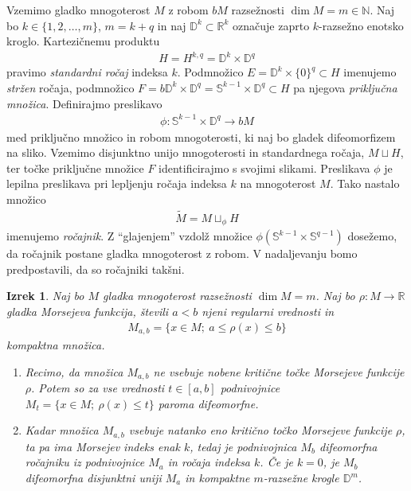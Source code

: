 \documentclass[12pt,a4paper,twoside]{article}
\theoremstyle{definition} %
\theoremstyle{plain} %
\newtheorem{izrek}[definicija]{Izrek}
\numberwithin{equation}{section}  %
\begin{document}
Vzemimo gladko mnogoterost $M$ z robom $bM$ razsežnosti $\dim M = m \in \mathbb{N}$.
Naj bo $k \in \{1, 2, \dots , m\}$, $m = k+q$ in naj $\mathbb{D}^{k} \subset \mathbb{R}^{k}$ označuje zaprto $k$-razsežno enotsko kroglo. Kartezičnemu produktu
\begin{gather*}
H = H^{k,q} = \mathbb{D}^{k} \times \mathbb{D}^{q}
\end{gather*}
pravimo \emph{standardni ročaj} indeksa $k$. Podmnožico $E = \mathbb{D}^{k} \times \{0\}^{q} \subset H$ imenujemo \emph{stržen} ročaja, podmnožico $F = b\mathbb{D}^{k} \times \mathbb{D}^{q} = \mathbb{S}^{k-1} \times \mathbb{D}^{q} \subset H$ pa njegova \emph{priključna množica}. \newline
Definirajmo preslikavo
\begin{gather*}
\phi \colon \mathbb{S}^{k-1} \times \mathbb{D}^{q} \to bM
\end{gather*}
med priključno množico in robom mnogoterosti, ki naj bo gladek difeomorfizem na sliko. Vzemimo disjunktno unijo mnogoterosti in standardnega ročaja, $M \sqcup H$, ter točke priključne množice $F$ identificirajmo s svojimi slikami. Preslikava $\phi$ je lepilna preslikava pri lepljenju ročaja indeksa $k$ na mnogoterost $M$. Tako nastalo množico 
\begin{gather*}
\widetilde{M} = M \sqcup_{\phi} H
\end{gather*}
imenujemo \emph{ročajnik}.
Z ``glajenjem'' vzdolž množice $\phi(\mathbb{S}^{k-1} \times \mathbb{S}^{q-1})$ dosežemo, da ročajnik postane gladka mnogoterost z robom. V nadaljevanju bomo predpostavili, da so ročajniki takšni.

\begin{izrek} \label{izr:rocajnik}
Naj bo $M$ gladka mnogoterost razsežnosti $\dim M= m$. Naj bo $\rho \colon M \to \mathbb{R}$ gladka Morsejeva funkcija, števili $a<b$ njeni regularni vrednosti in
\begin{gather*}
M_{a,b} = \{ x \in M; \ a \leq \rho(x) \leq b \}
\end{gather*}
kompaktna množica.
\begin{enumerate}
\item Recimo, da množica $M_{a,b}$ ne vsebuje nobene kritične točke Morsejeve funkcije $\rho$. Potem so za vse vrednosti $t \in [a,b]$ podnivojnice 
	$M_{t} = \{ x \in M; \ \rho(x) \leq t \}$ paroma difeomorfne.
\item Kadar množica $M_{a,b}$ vsebuje natanko eno kritično točko Morsejeve funkcije $\rho$, ta pa ima Morsejev indeks enak $k$, tedaj je podnivojnica 
	$M_{b}$ difeomorfna ročajniku iz podnivojnice $M_{a}$ in ročaja indeksa $k$.
	Če je $k=0$, je $M_{b}$ difeomorfna disjunktni uniji $M_{a}$ in kompaktne $m$-razsežne krogle $\mathbb{D}^{m}$.
\end{enumerate}
\end{izrek}
\end{document}
